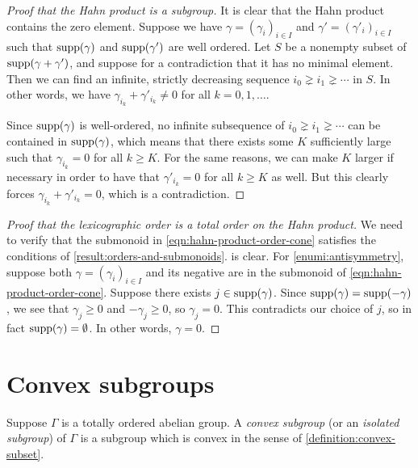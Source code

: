 \begin{proof}[Proof that the Hahn product is a subgroup]
It is clear that the Hahn product contains the zero element. Suppose we have $\gamma = (\gamma_i)_{i \in I}$ and $\gamma' = (\gamma'_i)_{i \in I}$ such that $\operatorname{supp}(\gamma)$ and $\operatorname{supp}(\gamma')$ are well ordered. Let $S$ be a nonempty subset of $\operatorname{supp}(\gamma + \gamma')$, and suppose for a contradiction that it has no minimal element. Then we can find an infinite, strictly decreasing sequence $i_0 \gneq i_1 \gneq \dotsb$ in $S$. In other words, we have $\gamma_{i_k} + \gamma'_{i_k} \neq 0$ for all $k = 0, 1, \dotsc$. 
	
Since $\operatorname{supp}(\gamma)$ is well-ordered, no infinite subsequence of $i_0 \gneq i_1 \gneq \dotsb$ can be contained in $\operatorname{supp}(\gamma)$, which means that there exists some $K$ sufficiently large such that $\gamma_{i_k} = 0$ for all $k \geq K$. For the same reasons, we can make $K$ larger if necessary in order to have that $\gamma'_{i_k} = 0$ for all $k \geq K$ as well. But this clearly forces $\gamma_{i_k} + \gamma'_{i_k} = 0$, which is a contradiction.  
\end{proof}

\begin{proof}[Proof that the lexicographic order is a total order on the Hahn product]
We need to verify that the submonoid in \cref{eqn:hahn-product-order-cone} satisfies the conditions of \cref{result:orders-and-submonoids}.  is clear. For \cref{enumi:antisymmetry}, suppose both $\gamma = (\gamma_{i})_{i \in I}$ and its negative are in the submonoid of \cref{eqn:hahn-product-order-cone}. Suppose there exists $j \in \operatorname{supp}(\gamma)$. Since $\operatorname{supp}(\gamma) = \operatorname{supp}(-\gamma)$, we see that $\gamma_j \geq 0$ and $-\gamma_j \geq 0$, so $\gamma_j = 0$. This contradicts our choice of $j$, so in fact $\operatorname{supp}(\gamma) = \emptyset$. In other words, $\gamma = 0$. 
\end{proof}

\section{Convex subgroups}

\begin{definition}
\label{definition:convex-subgroup}
Suppose $\Gamma$ is a totally ordered abelian group. A \emph{convex subgroup} (or an \emph{isolated subgroup}) of $\Gamma$ is a subgroup which is convex in the sense of \cref{definition:convex-subset}.
\end{definition}


